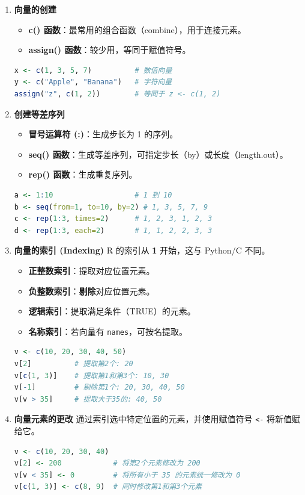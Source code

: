 \begin{enumerate}[label=\arabic*., leftmargin=2em]
    \item \textbf{向量的创建}
    \begin{itemize}
        \item \textbf{c() 函数}：最常用的组合函数（combine），用于连接元素。
        \item \textbf{assign() 函数}：较少用，等同于赋值符号。
    \end{itemize}
\begin{lstlisting}[language=R]
x <- c(1, 3, 5, 7)          # 数值向量
y <- c("Apple", "Banana")   # 字符向量
assign("z", c(1, 2))        # 等同于 z <- c(1, 2)
\end{lstlisting}

    \item \textbf{创建等差序列}
    \begin{itemize}
        \item \textbf{冒号运算符 (:)}：生成步长为 1 的序列。
        \item \textbf{seq() 函数}：生成等差序列，可指定步长（by）或长度（length.out）。
        \item \textbf{rep() 函数}：生成重复序列。
    \end{itemize}
\begin{lstlisting}[language=R]
a <- 1:10                   # 1 到 10
b <- seq(from=1, to=10, by=2) # 1, 3, 5, 7, 9
c <- rep(1:3, times=2)      # 1, 2, 3, 1, 2, 3
d <- rep(1:3, each=2)       # 1, 1, 2, 2, 3, 3
\end{lstlisting}

    \item \textbf{向量的索引 (Indexing)}
    R 的索引从 \textbf{1} 开始，这与 Python/C 不同。
    \begin{itemize}
        \item \textbf{正整数索引}：提取对应位置元素。
        \item \textbf{负整数索引}：\textbf{剔除}对应位置元素。
        \item \textbf{逻辑索引}：提取满足条件（TRUE）的元素。
        \item \textbf{名称索引}：若向量有 \texttt{names}，可按名提取。
    \end{itemize}
\begin{lstlisting}[language=R]
v <- c(10, 20, 30, 40, 50)
v[2]          # 提取第2个: 20
v[c(1, 3)]    # 提取第1和第3个: 10, 30
v[-1]         # 剔除第1个: 20, 30, 40, 50
v[v > 35]     # 提取大于35的: 40, 50
\end{lstlisting}
    \item \textbf{向量元素的更改}
    通过索引选中特定位置的元素，并使用赋值符号 \texttt{<-} 将新值赋给它。
\begin{lstlisting}[language=R]
v <- c(10, 20, 30, 40)
v[2] <- 200            # 将第2个元素修改为 200
v[v < 35] <- 0         # 将所有小于 35 的元素统一修改为 0
v[c(1, 3)] <- c(8, 9)  # 同时修改第1和第3个元素
\end{lstlisting}


\end{enumerate}
